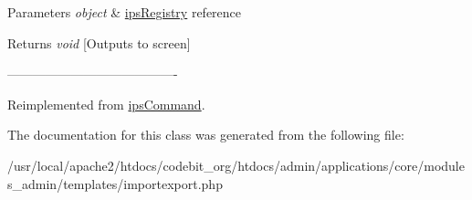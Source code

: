 \begin{DoxyParams}{Parameters}
{\em object} & \hyperlink{classips_registry}{ips\-Registry} reference \\
\hline
\end{DoxyParams}
\begin{DoxyReturn}{Returns}
{\itshape void} \mbox{[}Outputs to screen\mbox{]} 
\end{DoxyReturn}
----------------------------------------\/ 

Reimplemented from \hyperlink{classips_command_afbc4e912a0604b94d47d66744c64d8ba}{ips\-Command}.



The documentation for this class was generated from the following file\-:\begin{DoxyCompactItemize}
\item 
/usr/local/apache2/htdocs/codebit\-\_\-org/htdocs/admin/applications/core/modules\-\_\-admin/templates/importexport.\-php\end{DoxyCompactItemize}
